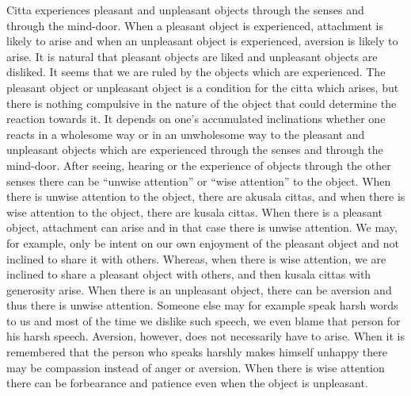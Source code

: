 \documentclass{book}
\begin{document}
Citta experiences pleasant and unpleasant objects through the senses and
through the mind-door. When a pleasant object is experienced, attachment
is likely to arise and when an unpleasant object is experienced,
aversion is likely to arise. It is natural that pleasant objects are
liked and unpleasant objects are disliked. It seems that we are ruled by
the objects which are experienced. The pleasant object or unpleasant
object is a condition for the citta which arises, but there is nothing
compulsive in the nature of the object that could determine the reaction
towards it. It depends on one's accumulated inclinations whether one
reacts in a wholesome way or in an unwholesome way to the pleasant and
unpleasant objects which are experienced through the senses and through
the mind-door. After seeing, hearing or the experience of objects
through the other senses there can be ``unwise attention'' or ``wise
attention'' to the object. When there is unwise attention to the object,
there are akusala cittas, and when there is wise attention to the
object, there are kusala cittas. When there is a pleasant object, 
attachment can arise and in that case there is unwise attention. We may,
for example, only be intent on our own enjoyment of the pleasant object
and not inclined to share it with others. Whereas, when there is wise
attention, we are inclined to share a pleasant object with others, and
then kusala cittas with generosity arise. When there is an unpleasant object, there can be aversion and thus there is unwise attention.    Someone else may for example speak harsh words to us and most of the 
time we dislike such speech, we even blame that person for his harsh speech. Aversion, however, does not necessarily have to arise.
When it is remembered that the person who speaks harshly makes himself
unhappy there may be compassion instead of anger or aversion. When there
is wise attention there can be forbearance and patience even when the
object is unpleasant.
\end{document}
